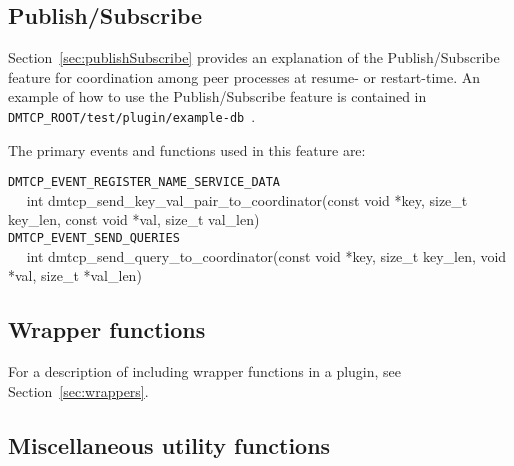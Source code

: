 \documentclass{article}
\begin{document}
\subsection{Publish/Subscribe}

Section~\ref{sec:publishSubscribe} provides an explanation of the
Publish/Subscribe feature for coordination among peer processes at resume-
or restart-time.  An example of how to use the Publish/Subscribe feature
is contained in {\tt DMTCP\_ROOT/test/plugin/example-db}~.

The primary events and functions used in this feature are:

\noindent
{\tt DMTCP\_EVENT\_REGISTER\_NAME\_SERVICE\_DATA} \\
\hbox{\ \ }
int dmtcp\_send\_key\_val\_pair\_to\_coordinator(const void *key,
                                                   size\_t key\_len,
                                                   const void *val,
                                                   size\_t val\_len) \\
{\tt DMTCP\_EVENT\_SEND\_QUERIES} \\
\hbox{\ \ }
int dmtcp\_send\_query\_to\_coordinator(const void *key, size\_t key\_len,
                                            void *val, size\_t *val\_len)

\subsection{Wrapper functions}

For a description of including wrapper functions in a plugin, see
Section~\ref{sec:wrappers}.

\subsection{Miscellaneous utility functions}
\end{document}
